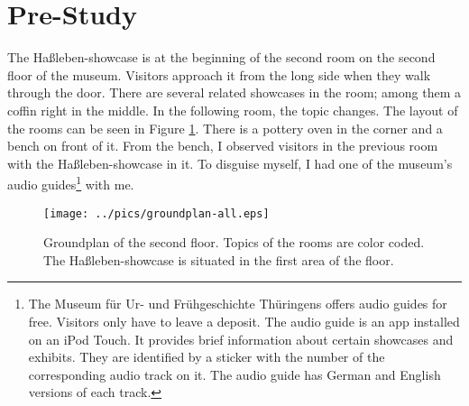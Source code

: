 
\section{Pre-Study}
\label{evaluation_pre}

The Haßleben-showcase is at the beginning of the second room on the second floor of the museum. Visitors approach it from the long side when they walk through the door. There are several related showcases in the room; among them a coffin right in the middle. In the following room, the topic changes. The layout of the rooms can be seen in Figure \ref{fig:hassleben_pottery_layout}. There is a pottery oven in the corner and a bench on front of it. From the bench, I observed visitors in the previous room with the Haßleben-showcase in it. To disguise myself, I had one of the museum's audio guides\footnote{The Museum für Ur- und Frühgeschichte Thüringens offers audio guides for free. Visitors only have to leave a deposit. The audio guide is an app installed on an iPod Touch. It provides brief information about certain showcases and exhibits. They are identified by a sticker with the number of the corresponding audio track on it. The audio guide has German and English versions of each track.} with me.  
\begin{figure}[H]%
\texttt{[image: ../pics/groundplan-all.eps]}%
\caption{Groundplan of the second floor. Topics of the rooms are color coded. The Haßleben-showcase is situated in the first area of the floor.}
\label{fig:hassleben_pottery_layout} %
\end{figure}
 
